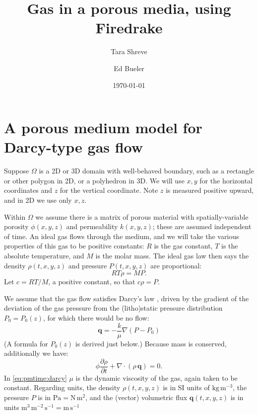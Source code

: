 \documentclass[11pt]{amsart}
\title{Gas in a porous media, using Firedrake}
\author{Tara Shreve}
\author{Ed Bueler}
\date{\today}
\newcommand{\bq}{\mathbf{q}}
\newcommand{\Div}{\nabla\cdot}
\newcommand{\grad}{\nabla}
\begin{document}
\maketitle

\thispagestyle{empty}

\section{A porous medium model for Darcy-type gas flow}

Suppose $\Omega$ is a 2D or 3D domain with well-behaved boundary, such as a rectangle or other polygon in 2D, or a polyhedron in 3D.  We will use $x,y$ for the horizontal coordinates and $z$ for the vertical coordinate.  Note $z$ is measured positive upward, and in 2D we use only $x,z$.

Within $\Omega$ we assume there is a matrix of porous material with spatially-variable porosity $\phi(x,y,z)$ and permeability $k(x,y,z)$; these are assumed independent of time.  An ideal gas flows through the medium, and we will take the various properties of this gas to be positive constants: $R$ is the gas constant, $T$ is the absolute temperature, and $M$ is the molar mass.  The ideal gas law then says the density $\rho(t,x,y,z)$ and pressure $P(t,x,y,z)$ are proportional:
\begin{equation}
RT \rho = M P.  \label{eq:ideal}
\end{equation}
Let $c = RT/M$, a positive constant, so that $c \rho = P$.

We assume that the gas flow satisfies Darcy's law \citep{Fowler2011}, driven by the gradient of the deviation of the gas pressure from the (litho)static pressure distribution $P_0=P_0(z)$, for which there would be no flow:
\begin{equation}
\bq = - \frac{k}{\mu} \grad\left(P - P_0\right) \label{eq:pmtime:darcy}
\end{equation}
(A formula for $P_0(z)$ is derived just below.)  Because mass is conserved, additionally we have:
\begin{equation}
\phi \frac{\partial \rho}{\partial t} + \Div \left(\rho\, \bq\right) = 0. \label{eq:pmtime:masscont}
\end{equation}
In \eqref{eq:pmtime:darcy} $\mu$ is the dynamic viscosity of the gas, again taken to be constant.  Regarding units, the density $\rho(t,x,y,z)$ is in SI units of $\text{kg}\,\text{m}^{-3}$, the pressure $P$ is in $\text{Pa} = \text{N}\,\text{m}^2$, and the (vector) volumetric flux $\bq(t,x,y,z)$ is in units $\text{m}^3\,\text{m}^{-2}\,\text{s}^{-1} = \text{m}\,\text{s}^{-1}$
\end{document}
